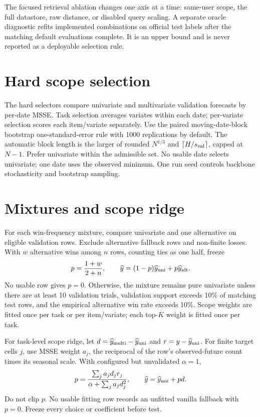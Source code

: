 \documentclass[11pt]{article}
\begin{document}
The focused retrieval ablation changes one axis at a time: same-user scope,
the full datastore, raw distance, or disabled query scaling. A separate oracle
diagnostic refits implemented combinations on official test labels after the
matching default evaluations complete. It is an upper bound and is never
reported as a deployable selection rule.

\section{Hard scope selection}
The hard selectors compare univariate and multivariate validation forecasts by
per-date MSSE. Task selection averages variates within each date; per-variate
selection scores each item/variate separately. Use the paired moving-date-block
bootstrap one-standard-error rule with 1000 replications by default. The
automatic block length is the larger of rounded $N^{1/3}$ and
$\lceil H/s_{\rm val}\rceil$, capped at $N-1$. Prefer univariate within the
admissible set. No usable date selects univariate; one date uses the observed
minimum. One run seed controls backbone stochasticity and bootstrap sampling.

\section{Mixtures and scope ridge}
For each win-frequency mixture, compare univariate and one alternative on
eligible validation rows. Exclude alternative fallback rows and non-finite
losses. With $w$ alternative wins among $n$ rows, counting ties as one half,
freeze
\[
p=\frac{1+w}{2+n},\qquad
\widehat y=(1-p)\widehat y_{\rm uni}+p\widehat y_{\rm alt}.
\]
No usable row gives $p=0$. Otherwise, the mixture remains pure univariate
unless there are at least 10 validation trials, validation support exceeds
10\% of matching test rows, and the empirical alternative win rate exceeds
10\%. Scope weights are fitted once per task or per item/variate; each
top-$K$ weight is fitted once per task.

For task-level scope ridge, let
$d=\widehat y_{\rm multi}-\widehat y_{\rm uni}$ and
$r=y-\widehat y_{\rm uni}$. For finite target cells $j$, use MSSE weight $a_j$,
the reciprocal of the row's observed-future count times its seasonal scale.
With configured but unvalidated $\alpha=1$,
\[
p=\frac{\sum_j a_jd_jr_j}{\alpha+\sum_j a_jd_j^2},\qquad
\widehat y=\widehat y_{\rm uni}+pd.
\]
Do not clip $p$. No usable fitting row records an unfitted vanilla fallback
with $p=0$. Freeze every choice or coefficient before test.
\end{document}
